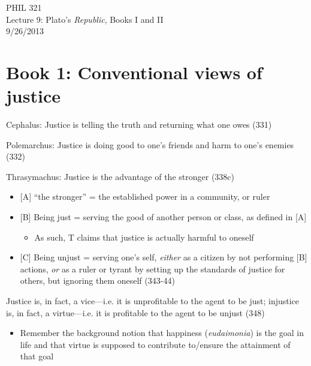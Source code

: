 \documentclass[11pt]{article}
\begin{document}
\thispagestyle{empty}
\begin{center} \LARGE{PHIL 321\\ Lecture 9: Plato's \emph{Republic}, Books I and II}\\ \vspace*{2mm}
\large{9/26/2013}\end{center}
\thispagestyle{empty}\vspace*{3mm}
\vspace*{-8mm}

\section*{Book 1: Conventional views of justice}

\noindent Cephalus: Justice is telling the truth and returning what one owes (331)
\vspace*{2mm}

\noindent Polemarchus: Justice is doing good to one's friends and harm to one's enemies (332)
\vspace*{2mm}

\noindent Thrasymachus: Justice is the advantage of the stronger (338c)
\begin{itemize}\item{[A] ``the stronger'' = the established power in a community, or ruler}\item{[B] Being just = serving the good of another person or class, as defined in [A]}\begin{itemize}\item{As such, T claims that justice is actually harmful to oneself}\end{itemize}\item{[C] Being unjust = serving one's self, \emph{either} as a citizen by not performing [B] actions, \emph{or} as a ruler or tyrant by setting up the standards of justice for others, but ignoring them oneself (343-44)}\end{itemize}

\noindent Justice is, in fact, a vice---i.e. it is unprofitable to the agent to be just; injustice is, in fact, a virtue---i.e. it is profitable to the agent to be unjust (348)

\begin{itemize}\item{Remember the background notion that happiness (\emph{eudaimonia}) is the goal in life and that virtue is supposed to contribute to/ensure the attainment of that goal}\end{itemize}
\end{document}
